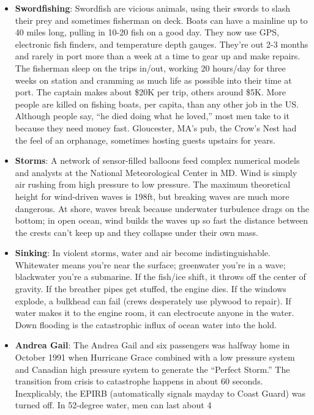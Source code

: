 \documentclass[
]{article}
\begin{document}
\begin{itemize}
\item
  \textbf{Swordfishing}: Swordfish are vicious animals, using their
  swords to slash their prey and sometimes fisherman on deck. Boats can
  have a mainline up to 40 miles long, pulling in 10-20 fish on a good
  day. They now use GPS, electronic fish finders, and temperature depth
  gauges. They're out 2-3 months and rarely in port more than a week at
  a time to gear up and make repairs. The fisherman sleep on the trips
  in/out, working 20 hours/day for three weeks on station and cramming
  as much life as possible into their time at port. The captain makes
  about \$20K per trip, others around \$5K. More people are killed on
  fishing boats, per capita, than any other job in the US. Although
  people say, ``he died doing what he loved,'' most men take to it
  because they need money fast. Gloucester, MA's pub, the Crow's Nest
  had the feel of an orphanage, sometimes hosting guests upstairs for
  years.
\item
  \textbf{Storms}: A network of sensor-filled balloons feed complex
  numerical models and analysts at the National Meteorological Center in
  MD. Wind is simply air rushing from high pressure to low pressure. The
  maximum theoretical height for wind-driven waves is 198ft, but
  breaking waves are much more dangerous. At shore, waves break because
  underwater turbulence drags on the bottom; in open ocean, wind builds
  the waves up so fast the distance between the crests can't keep up and
  they collapse under their own mass.
\item
  \textbf{Sinking}: In violent storms, water and air become
  indistinguishable. Whitewater means you're near the surface;
  greenwater you're in a wave; blackwater you're a submarine. If the
  fish/ice shift, it throws off the center of gravity. If the breather
  pipes get stuffed, the engine dies. If the windows explode, a bulkhead
  can fail (crews desperately use plywood to repair). If water makes it
  to the engine room, it can electrocute anyone in the water. Down
  flooding is the catastrophic influx of ocean water into the hold.
\item
  \textbf{Andrea Gail}: The Andrea Gail and six passengers was halfway
  home in October 1991 when Hurricane Grace combined with a low pressure
  system and Canadian high pressure system to generate the ``Perfect
  Storm.'' The transition from crisis to catastrophe happens in about 60
  seconds. Inexplicably, the EPIRB (automatically signals mayday to
  Coast Guard) was turned off. In 52-degree water, men can last about 4

\end{itemize}
\end{document}
